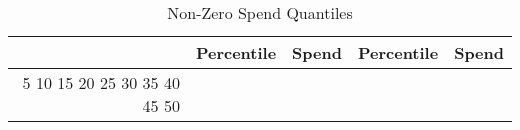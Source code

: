 \begin{table}[ht]
\centering
\caption{Non-Zero Spend Quantiles} 
\label{tab:cutoffs}
\begin{tabular}{rrrrr}
  \hline
 & Percentile & Spend & Percentile & Spend \\ 
  \hline
5%
  10%
  15%
  20%
  25%
  30%
  35%
  40%
  45%
  50%
   \hline
\end{tabular}
\end{table}
